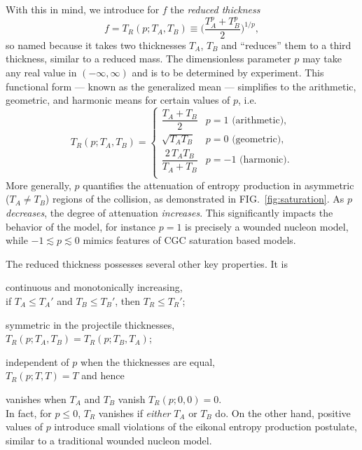 \documentclass[aps,prl,reprint,amsmath,nofootinbib]{revtex4-1}
\begin{document}
With this in mind, we introduce for $f$ the \emph{reduced thickness}
\begin{equation}
  f = T_R(p; T_A, T_B) \equiv \biggl( \frac{T_A^p + T_B^p}{2} \biggr)^{1/p},
  \label{eq:tr}
\end{equation}
so named because it takes two thicknesses $T_A$, $T_B$ and ``reduces'' them to a third thickness, similar to a
reduced mass.  The dimensionless parameter $p$ may take any real value in $(-\infty, \infty)$ and is to be
determined by experiment.  This functional form --- known as the generalized mean --- simplifies to the arithmetic,
geometric, and harmonic means for certain values of $p$, i.e.
\begin{equation}
  T_R(p; T_A, T_B) =
  \begin{cases}
    \dfrac{T_A + T_B}{2} & p = 1 \text{ (arithmetic)}, \\[2ex]
    \sqrt{T_A T_B} & p = 0 \text{ (geometric)}, \\[2ex]
    \dfrac{2\, T_A T_B}{T_A + T_B} & p = -1 \text{ (harmonic)}. \\
  \end{cases}
\end{equation}
More generally, $p$ quantifies the attenuation of entropy production in asymmetric ($T_A \neq T_B$) regions of
the collision, as demonstrated in FIG.~\ref{fig:saturation}.  As $p$ \emph{decreases}, the degree of
attenuation \emph{increases}.  This significantly impacts the behavior of the model, for instance $p=1$ is
precisely a wounded nucleon model, while $-1 \lesssim p \lesssim 0$ mimics features of CGC saturation based models.

The reduced thickness possesses several other key properties.  It is
\renewcommand{\labelenumi}{(\alph{enumi})}
\begin{enumerate*}
  \item continuous and monotonically increasing, \\ if $T_A \leq T_A'$ and $T_B \leq T_B'$, then $T_R \leq T_R'$;
  \item symmetric in the projectile thicknesses, \\ $T_R(p; T_A, T_B) = T_R(p; T_B, T_A)$;
  \item independent of $p$ when the thicknesses are equal, \\ $T_R(p; T, T) = T$ and hence
  \item vanishes when $T_A$ and $T_B$ vanish $T_R(p; 0, 0) = 0$. \\ In fact, for $p \leq 0$, $T_R$ vanishes 
     if \emph{either} $T_A$ or $T_B$ do.  On the other hand, positive values of $p$ introduce small violations 
    of the eikonal entropy production postulate, similar to a traditional wounded nucleon model.
\end{enumerate*}
\end{document}
